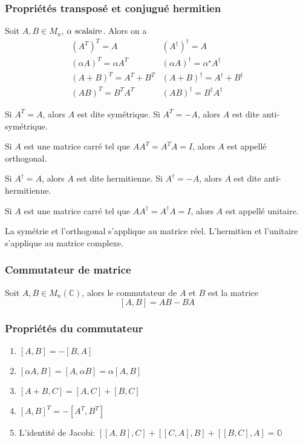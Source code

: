 \subsubsection{Propriétés transposé et conjugué hermitien}
Soit $A, B \in M_n$, $\alpha \text{ scalaire}$. Alors on a
\[
    \begin{matrix}
        \left( A^T \right)^T = A               & \left( A^\dagger \right)^\dagger = A                     \\[0.5em]
        \left( \alpha A \right)^T = \alpha A^T & \left( \alpha A \right)^\dagger = \alpha^\star A^\dagger \\[0.5em]
        \left( A + B \right)^T = A^T + B^T     & \left( A + B \right)^\dagger = A^\dagger + B^\dagger     \\[0.5em]
        \left( AB \right)^T = B^TA^T           & \left( AB \right)^\dagger = B^\dagger A^\dagger
    \end{matrix}
\]
\begin{definition}
    Si $A^T = A$, alors $A$ est dite symétrique. Si $A^T = -A$, alors $A$ est dite anti-symétrique.
\end{definition}
\begin{definition}
    Si $A$ est une matrice carré tel que $AA^T = A^TA = I$, alors $A$ est appellé orthogonal.
\end{definition}
\begin{definition}
    Si $A^\dagger = A$, alors $A$ est dite hermitienne. Si $A^\dagger = -A$, alors $A$ est dite anti-hermitienne.
\end{definition}
\begin{definition}
    Si $A$ est une matrice carré tel que $AA^\dagger = A^\dagger A = I$, alors $A$ est appellé unitaire.
\end{definition}
\begin{remark}
    La symétrie et l'orthogonal s'applique au matrice réel.
    L'hermitien et l'unitaire s'applique au matrice complexe.
\end{remark}

\subsubsection{Commutateur de matrice}
Soit $A, B \in M_n(\mathbb{C})$, alors le commutateur de $A$ et $B$ est la matrice
\[ \left[ A, B \right] = AB - BA \]

\subsubsection{Propriétés du commutateur}
\begin{enumerate}
    \item $[A, B] = -[B, A]$
    \item $[\alpha A, B ] = [A, \alpha B] = \alpha [A, B]$
    \item $[A + B, C] = [A, C] + [B, C]$
    \item $[A, B]^T = -[A^T, B^T]$
    \item L'identité de Jacobi: $[[A, B], C] + [[C, A], B] + [[B, C], A] = \mathbb{O}$
\end{enumerate}

